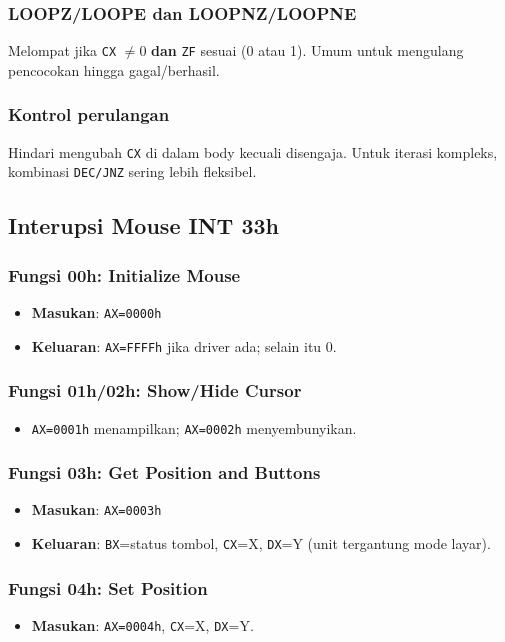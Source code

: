\subsubsection{LOOPZ/LOOPE dan LOOPNZ/LOOPNE}
Melompat jika \texttt{CX} \(\neq 0\) \textbf{dan} \texttt{ZF} sesuai (0 atau 1). Umum untuk mengulang pencocokan hingga gagal/berhasil.

\subsubsection{Kontrol perulangan}
Hindari mengubah \texttt{CX} di dalam body kecuali disengaja. Untuk iterasi kompleks, kombinasi \texttt{DEC/JNZ} sering lebih fleksibel.

\subsection{Interupsi Mouse INT 33h}
\subsubsection{Fungsi 00h: Initialize Mouse}
\begin{itemize}
  \item \textbf{Masukan}: \texttt{AX=0000h}
  \item \textbf{Keluaran}: \texttt{AX=FFFFh} jika driver ada; selain itu 0.
\end{itemize}

\subsubsection{Fungsi 01h/02h: Show/Hide Cursor}
\begin{itemize}
  \item \texttt{AX=0001h} menampilkan; \texttt{AX=0002h} menyembunyikan.
\end{itemize}

\subsubsection{Fungsi 03h: Get Position and Buttons}
\begin{itemize}
  \item \textbf{Masukan}: \texttt{AX=0003h}
  \item \textbf{Keluaran}: \texttt{BX}=status tombol, \texttt{CX}=X, \texttt{DX}=Y (unit tergantung mode layar).
\end{itemize}

\subsubsection{Fungsi 04h: Set Position}
\begin{itemize}
  \item \textbf{Masukan}: \texttt{AX=0004h}, \texttt{CX}=X, \texttt{DX}=Y.
\end{itemize}

